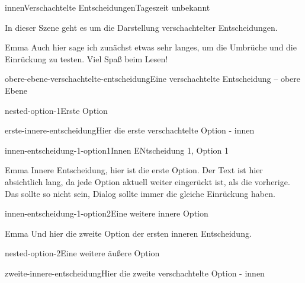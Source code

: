 \documentclass[12pt]{article}
\begin{document}
    \begin{scene}{innen}{Verschachtelte Entscheidungen}{Tageszeit unbekannt}
        \begin{scenedescription}
            In dieser Szene geht es um die Darstellung verschachtelter Entscheidungen.
        \end{scenedescription}

        \begin{dialog}{Emma}
            Auch hier sage ich zunächst etwas sehr langes, um die Umbrüche und die Einrückung zu testen.
            Viel Spaß beim Lesen!
        \end{dialog}

        \begin{decision}{obere-ebene-verschachtelte-entscheidung}{Eine verschachtelte Entscheidung -- obere Ebene}
            \begin{option}{nested-option-1}{Erste Option}
                \begin{decision}{erste-innere-entscheidung}{Hier die erste verschachtelte Option - innen}
                    \begin{option}{innen-entscheidung-1-option1}{Innen ENtscheidung 1, Option 1}
                        \begin{dialog}{Emma}
                            Innere Entscheidung, hier ist die erste Option.
                            Der Text ist hier absichtlich lang, da jede Option aktuell weiter eingerückt ist, als die vorherige.
                            Das sollte so nicht sein, Dialog sollte immer die gleiche Einrückung haben.
                        \end{dialog}
                    \end{option}
                    \begin{option}{innen-entscheidung-1-option2}{Eine weitere innere Option}
                        \begin{dialog}{Emma}
                            Und hier die zweite Option der ersten inneren Entscheidung.
                        \end{dialog}
                    \end{option}
                \end{decision}
            \end{option}
            \begin{option}{nested-option-2}{Eine weitere äußere Option}
                \begin{decision}{zweite-innere-entscheidung}{Hier die zweite verschachtelte Option - innen}

\end{decision}
\end{option}
\end{decision}
\end{scene}
\end{document}
